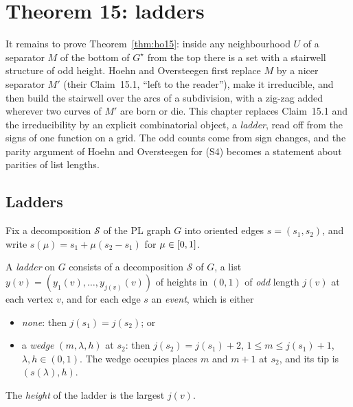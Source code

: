 \chapter{Theorem 15: ladders}\label{ch:ladders}

It remains to prove Theorem~\ref{thm:ho15}: inside any neighbourhood $U$ of a separator $M$ of the bottom of $G^\star$ from the top there is a set with a
stairwell structure of odd height. Hoehn and Oversteegen first replace $M$ by a nicer separator $M'$ (their Claim~15.1, ``left to the reader''), make it irreducible,
and then build the stairwell over the arcs of a subdivision, with a zig-zag added wherever two curves of $M'$ are born or die. This chapter replaces Claim~15.1
and the irreducibility by an explicit combinatorial object, a \emph{ladder}, read off from the signs of one function on a grid. The odd counts come from
sign changes, and the parity argument of Hoehn and Oversteegen for (S4) becomes a statement about parities of list lengths.

\section{Ladders}

Fix a decomposition $\mathcal S$ of the PL graph $G$ into oriented edges $s=(s_1,s_2)$, and write $s(\mu)=s_1+\mu(s_2-s_1)$ for $\mu\in[0,1]$.

\begin{definition}[Ladder]\label{def:ladder}
A \emph{ladder} on $G$ consists of a decomposition $\mathcal S$ of $G$, a list $y(v)=(y_1(v),\dots,y_{j(v)}(v))$ of heights in $(0,1)$ of \emph{odd} length $j(v)$ at each vertex $v$, and
for each edge $s$ an \emph{event}, which is either
\begin{itemize}
\item \emph{none}: then $j(s_1)=j(s_2)$; or
\item a \emph{wedge} $(m,\lambda,h)$ at $s_2$: then $j(s_2)=j(s_1)+2$, $1\le m\le j(s_1)+1$, $\lambda,h\in(0,1)$. The wedge occupies places $m$ and $m+1$ at $s_2$, and its tip is
$(s(\lambda),h)$.
\end{itemize}
The \emph{height} of the ladder is the largest $j(v)$.
\end{definition}


